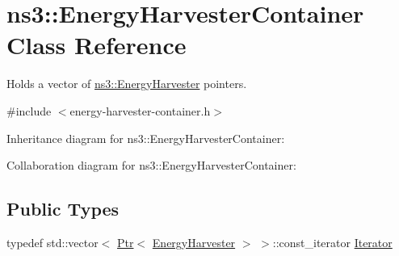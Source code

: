 \hypertarget{classns3_1_1EnergyHarvesterContainer}{}\section{ns3\+:\+:Energy\+Harvester\+Container Class Reference}
\label{classns3_1_1EnergyHarvesterContainer}


Holds a vector of \hyperlink{classns3_1_1EnergyHarvester}{ns3\+::\+Energy\+Harvester} pointers.  




{\ttfamily \#include $<$energy-\/harvester-\/container.\+h$>$}



Inheritance diagram for ns3\+:\+:Energy\+Harvester\+Container\+:


Collaboration diagram for ns3\+:\+:Energy\+Harvester\+Container\+:
\subsection*{Public Types}
\begin{DoxyCompactItemize}
\item 
typedef std\+::vector$<$ \hyperlink{classns3_1_1Ptr}{Ptr}$<$ \hyperlink{classns3_1_1EnergyHarvester}{Energy\+Harvester} $>$ $>$\+::const\+\_\+iterator \hyperlink{classns3_1_1EnergyHarvesterContainer_a0b4cce51dcd5f30832fd89270b3e1b67}{Iterator}
\end{DoxyCompactItemize}
